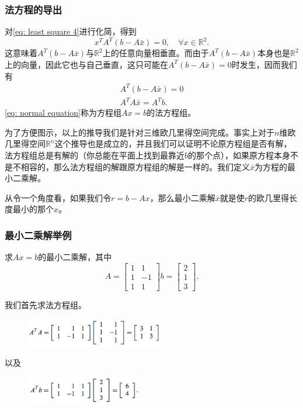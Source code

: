 \documentclass[10pt]{beamer}
\def\R{\mathbb{R}}
\begin{document}
\begin{frame}
\frametitle{法方程的导出}
对\eqref{eq: least square 4}进行化简，得到
\begin{equation}
x^TA^T(b - A\bar{x}) = 0 ,\quad \forall x \in \R^2.
\end{equation}
这意味着$A^T(b - A\bar{x})$与$\R^2$上的任意向量相垂直。而由于$A^T(b - A\bar{x})$本身也是$\R^2$上的向量，因此它也与自己垂直，这只可能在$A^T(b - A\bar{x}) = 0$时发生，因而我们有
\begin{align}
\label{eq: normal equation}
A^T(b - A\bar{x}) = 0 \nonumber \\
A^TA\bar{x} = A^T b.
\end{align}
\eqref{eq: normal equation}称为方程组$Ax = b$的法方程组。

\vspace{0.2cm}

为了方便图示，以上的推导我们是针对三维欧几里得空间完成。事实上对于$n$维欧几里得空间$\R^n$这个推导也是成立的，并且我们可以证明不论原方程组是否有解，法方程组总是有解的（你总能在平面上找到最靠近$b$的那个点），如果原方程本身不是不相容的，那么法方程组的解跟原方程组的解是一样的。我们定义$\bar{x}$为方程的最小二乘解。

\vspace{0.2cm}

从令一个角度看，如果我们令$r = b - Ax$，那么最小二乘解$\bar{x}$就是使$r$的欧几里得长度最小的那个$x$。
\end{frame}


\begin{frame}
\frametitle{最小二乘解举例}
\begin{example}
求$Ax = b$的最小二乘解，其中
\begin{equation}
A = \left[ \begin{array}{cc}
     1    & 1 \\
     1    &   -1 \\
     1    &  1                          
            \end{array} \right] 
b = \left[ \begin{array}{c}
     2 \\ 1 \\3  \end{array} \right].
\end{equation}
\end{example}
我们首先求法方程组。
\begin{figure}
\includegraphics[width=6cm]{figs/4-1-1_Normal_Equations-1} 
\end{figure}
以及
\begin{figure}
\includegraphics[width=5cm]{figs/4-1-1_Normal_Equations-2} 
\end{figure}
\end{frame}
\end{document}
